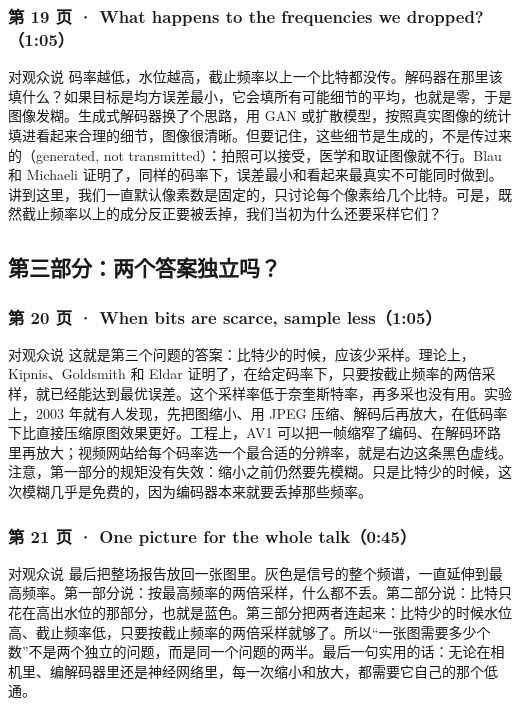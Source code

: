 \subsubsection*{第 19 页 · What happens to the frequencies we dropped?（1:05）}
\begin{exampleblock}{对观众说}
码率越低，水位越高，截止频率以上一个比特都没传。解码器在那里该填什么？如果目标是均方误差最小，它会填所有可能细节的平均，也就是零，于是图像发糊。生成式解码器换了个思路，用 GAN 或扩散模型，按照真实图像的统计填进看起来合理的细节，图像很清晰。但要记住，这些细节是生成的，不是传过来的（generated, not transmitted）：拍照可以接受，医学和取证图像就不行。Blau 和 Michaeli 证明了，同样的码率下，误差最小和看起来最真实不可能同时做到。讲到这里，我们一直默认像素数是固定的，只讨论每个像素给几个比特。可是，既然截止频率以上的成分反正要被丢掉，我们当初为什么还要采样它们？
\end{exampleblock}

\subsection*{第三部分：两个答案独立吗？}

\subsubsection*{第 20 页 · When bits are scarce, sample less（1:05）}
\begin{exampleblock}{对观众说}
这就是第三个问题的答案：比特少的时候，应该少采样。理论上，Kipnis、Goldsmith 和 Eldar 证明了，在给定码率下，只要按截止频率的两倍采样，就已经能达到最优误差。这个采样率低于奈奎斯特率，再多采也没有用。实验上，2003 年就有人发现，先把图缩小、用 JPEG 压缩、解码后再放大，在低码率下比直接压缩原图效果更好。工程上，AV1 可以把一帧缩窄了编码、在解码环路里再放大；视频网站给每个码率选一个最合适的分辨率，就是右边这条黑色虚线。注意，第一部分的规矩没有失效：缩小之前仍然要先模糊。只是比特少的时候，这次模糊几乎是免费的，因为编码器本来就要丢掉那些频率。
\end{exampleblock}

\subsubsection*{第 21 页 · One picture for the whole talk（0:45）}
\begin{exampleblock}{对观众说}
最后把整场报告放回一张图里。灰色是信号的整个频谱，一直延伸到最高频率。第一部分说：按最高频率的两倍采样，什么都不丢。第二部分说：比特只花在高出水位的那部分，也就是蓝色。第三部分把两者连起来：比特少的时候水位高、截止频率低，只要按截止频率的两倍采样就够了。所以“一张图需要多少个数”不是两个独立的问题，而是同一个问题的两半。最后一句实用的话：无论在相机里、编解码器里还是神经网络里，每一次缩小和放大，都需要它自己的那个低通。
\end{exampleblock}

